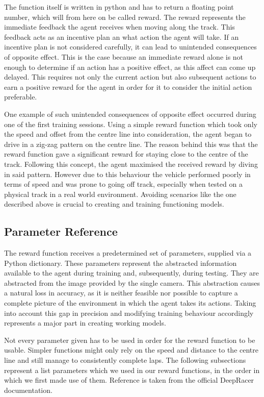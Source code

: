 The function itself is written in python and has to return a floating point number, which will from here on be called reward. The reward represents the immediate feedback the agent receives when moving along the track. This feedback acts as an incentive plan an what action the agent will take. If an incentive plan is not considered carefully, it can lead to unintended consequences of opposite effect. This is the case because an immediate reward alone is not enough to determine if an action has a positive effect, as this affect can come up delayed. This requires not only the current action but also subsequent actions to earn a positive reward for the agent in order for it to consider the initial action preferable. 


One example of such unintended consequences of opposite effect occurred during one of the first training sessions. Using a simple reward function which took only the speed and offset from the centre line into consideration, the agent began to drive in a zig-zag pattern on the centre line. The reason behind this was that the reward function gave a significant reward for staying close to the centre of the track. Following this concept, the agent maximised the received reward by diving in said pattern. However due to this behaviour the vehicle performed poorly in terms of speed and was prone to going off track, especially when tested on a physical track in a real world environment. Avoiding scenarios like the one described above is crucial to creating and training functioning models.

\subsection{Parameter Reference}
The reward function receives a predetermined set of parameters, supplied via a Python dictionary. These parameters represent the abstracted information available to the agent during  training and, subsequently, during testing. They are abstracted from the image provided by the single camera. This abstraction causes a natural loss in accuracy, as it is neither feasible nor possible to capture a complete picture of the environment in which the agent takes its actions. Taking into account this gap in precision and modifying training behaviour accordingly  represents a major part in creating working models.

Not every parameter given has to be used in order for the reward function to be usable. Simpler functions might only rely on the speed and distance to the centre line and still manage to consistently complete laps. The following subsections represent a list parameters which we used in our reward functions, in the order in which we first made use of them. Reference is taken from the official DeepRacer documentation.

